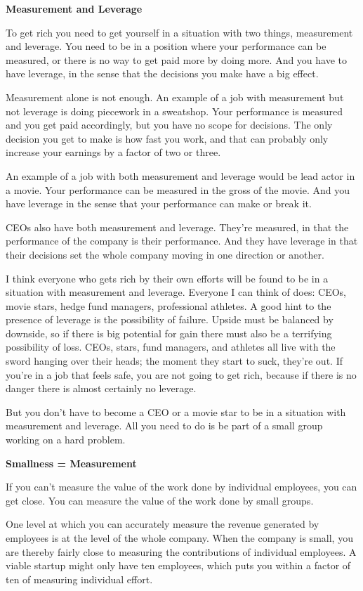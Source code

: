 \textbf{Measurement and Leverage}

To get rich you need to get yourself in a situation with two things,
measurement and leverage. You need to be in a position where your
performance can be measured, or there is no way to get paid more by
doing more. And you have to have leverage, in the sense that the
decisions you make have a big effect.

Measurement alone is not enough. An example of a job with measurement
but not leverage is doing piecework in a sweatshop. Your performance is
measured and you get paid accordingly, but you have no scope for
decisions. The only decision you get to make is how fast you work, and
that can probably only increase your earnings by a factor of two or
three.

An example of a job with both measurement and leverage would be lead
actor in a movie. Your performance can be measured in the gross of the
movie. And you have leverage in the sense that your performance can make
or break it.

CEOs also have both measurement and leverage. They're measured, in that
the performance of the company is their performance. And they have
leverage in that their decisions set the whole company moving in one
direction or another.

I think everyone who gets rich by their own efforts will be found to be
in a situation with measurement and leverage. Everyone I can think of
does: CEOs, movie stars, hedge fund managers, professional athletes. A
good hint to the presence of leverage is the possibility of failure.
Upside must be balanced by downside, so if there is big potential for
gain there must also be a terrifying possibility of loss. CEOs, stars,
fund managers, and athletes all live with the sword hanging over their
heads; the moment they start to suck, they're out. If you're in a job
that feels safe, you are not going to get rich, because if there is no
danger there is almost certainly no leverage.

But you don't have to become a CEO or a movie star to be in a situation
with measurement and leverage. All you need to do is be part of a small
group working on a hard problem.

\textbf{Smallness = Measurement}

If you can't measure the value of the work done by individual employees,
you can get close. You can measure the value of the work done by small
groups.

One level at which you can accurately measure the revenue generated by
employees is at the level of the whole company. When the company is
small, you are thereby fairly close to measuring the contributions of
individual employees. A viable startup might only have ten employees,
which puts you within a factor of ten of measuring individual effort.

